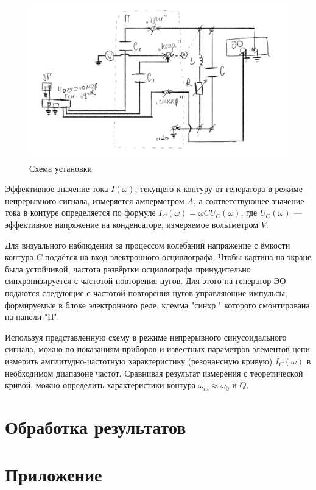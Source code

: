\documentclass[a4paper, 12pt]{article}
\begin{document}
\begin{figure}[h]
    \centering
    \includegraphics[width=1\textwidth]{set}
    \caption{Схема установки}
    \label{fig:set}
\end{figure}

Эффективное значение тока $I(\omega)$, текущего к контуру от генератора в режиме непрерывного сигнала, 
измеряется амперметром $A$, а соответствующее значение тока в контуре определяется по формуле $I_C(\omega) = \omega C U_C (\omega)$,
где $U_C(\omega)$ --- эффективное напряжение на конденсаторе, измеряемое вольтметром $V$.

Для визуального наблюдения за процессом колебаний напряжение с ёмкости контура $C$ подаётся на вход электронного
осциллографа. Чтобы картина на экране была устойчивой, частота развёртки осциллографа принудительно синхронизируется
с частотой повторения цугов. Для этого на генератор ЭО подаются следующие с частотой повторения цугов управляющие 
импульсы, формируемые в блоке электронного реле, клемма "синхр."{} которого смонтирована на панели "П".

Используя представленную схему в режиме непрерывного синусоидального сигнала, можно по показаниям приборов и известных
параметров элементов цепи измерить амплитудно-частотную характеристику (резонансную кривую) $I_C(\omega)$ в необходимом
диапазоне частот. Сравнивая результат измерения с теоретической кривой, можно определить характеристики контура
$\omega_m \approx \omega_0$ и $Q$.

\section{Обработка результатов}



\section{Приложение}
\end{document}
